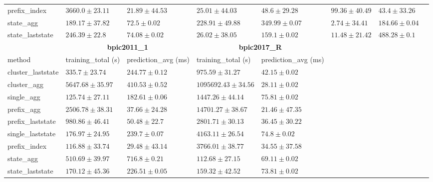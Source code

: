 \documentclass[twoside,11pt]{Latex/Classes/PhDthesisPSnPDF}
\begin{document}
\begin{table}[h]
{\begin{tabular}{llllllll}
			prefix\_index & $3660.0 \pm 23.11$ & $\mathbf{21.89 \pm 44.53}$ & $25.01 \pm 44.03$ & $48.6 \pm 29.28$ & $99.36 \pm 40.49$ & $43.4 \pm 33.26$ \\ 
			state\_agg & $\mathbf{189.17 \pm 37.82}$ & $72.5 \pm 0.02$ & $228.91 \pm 49.88$ & $349.99 \pm 0.07$ & $\mathbf{2.74 \pm 34.41}$ & $184.66 \pm 0.04$ \\ 
			state\_laststate & $246.39 \pm 22.8$ & $74.08 \pm 0.02$ & $26.02 \pm 38.05$ & $159.1 \pm 0.02$ & $11.48 \pm 21.42$ & $488.28 \pm 0.1$ \\ 
			\bottomrule
			\toprule
			& \multicolumn{2}{c}{{\bfseries bpic2011\_1}} & \multicolumn{2}{c}{{\bfseries bpic2017\_R}} \\ \cmidrule(lr){2-3} \cmidrule(lr){4-5} \cmidrule(lr){6-7}
			method  & training\_total (s) & prediction\_avg (ms) & training\_total (s) & prediction\_avg (ms) \\ \midrule
			cluster\_laststate & $335.7 \pm 23.74$ & $244.77 \pm 0.12$ & $975.59 \pm 31.27$ & $42.15 \pm 0.02$ \\ 
			cluster\_agg & $5647.68 \pm 35.97$ & $410.53 \pm 0.52$ & $1095692.43 \pm 34.56$ & $28.11 \pm 0.02$ \\ 
			single\_agg & $125.74 \pm 27.11$ & $182.61 \pm 0.06$ & $1447.26 \pm 44.14$ & $75.81 \pm 0.02$ \\ 
			prefix\_agg & $2506.78 \pm 38.31$ & $37.66 \pm 24.28$ & $14701.27 \pm 38.67$ & $\mathbf{21.46 \pm 47.35}$ \\ 
			prefix\_laststate & $980.86 \pm 46.41$ & $50.48 \pm 22.7$ & $2801.71 \pm 30.13$ & $36.45 \pm 30.22$ \\ 
			single\_laststate & $176.97 \pm 24.95$ & $239.7 \pm 0.07$ & $4163.11 \pm 26.54$ & $74.8 \pm 0.02$ \\ 
			prefix\_index & $116.88 \pm 33.74$ & $\mathbf{29.48 \pm 43.14}$ & $3766.01 \pm 38.77$ & $34.55 \pm 37.58$ \\ 
			state\_agg & $510.69 \pm 39.97$ & $716.8 \pm 0.21$ & $\mathbf{112.68 \pm 27.15}$ & $69.11 \pm 0.02$ \\ 
			state\_laststate & $\mathbf{170.12 \pm 45.36}$ & $226.51 \pm 0.05$ & $159.32 \pm 42.52$ & $73.81 \pm 0.02$ \\ 
			\bottomrule
			
			
		\end{tabular}%
	}
\end{table}



\end{document}
